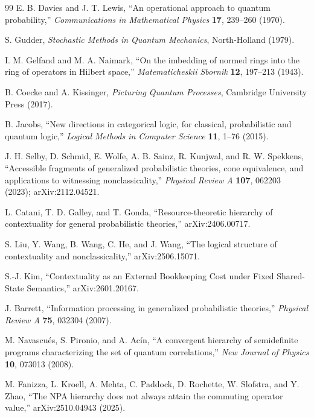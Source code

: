 \documentclass[11pt]{article}
\begin{document}
\begin{thebibliography}{99}
E. B. Davies and J. T. Lewis, ``An operational approach to quantum probability,'' \emph{Communications in Mathematical Physics} \textbf{17}, 239--260 (1970).

S. Gudder, \emph{Stochastic Methods in Quantum Mechanics}, North-Holland (1979).


I. M. Gelfand and M. A. Naimark, ``On the imbedding of normed rings into the ring of operators in Hilbert space,'' \emph{Matematicheskii Sbornik} \textbf{12}, 197--213 (1943).

B. Coecke and A. Kissinger, \emph{Picturing Quantum Processes}, Cambridge University Press (2017).

B. Jacobs, ``New directions in categorical logic, for classical, probabilistic and quantum logic,'' \emph{Logical Methods in Computer Science} \textbf{11}, 1--76 (2015).

J. H. Selby, D. Schmid, E. Wolfe, A. B. Sainz, R. Kunjwal, and R. W. Spekkens, ``Accessible fragments of generalized probabilistic theories, cone equivalence, and applications to witnessing nonclassicality,'' \emph{Physical Review A} \textbf{107}, 062203 (2023); arXiv:2112.04521.

L. Catani, T. D. Galley, and T. Gonda, ``Resource-theoretic hierarchy of contextuality for general probabilistic theories,'' arXiv:2406.00717.

S. Liu, Y. Wang, B. Wang, C. He, and J. Wang, ``The logical structure of contextuality and nonclassicality,'' arXiv:2506.15071.

S.-J. Kim, ``Contextuality as an External Bookkeeping Cost under Fixed Shared-State Semantics,'' arXiv:2601.20167.

J. Barrett, ``Information processing in generalized probabilistic theories,'' \emph{Physical Review A} \textbf{75}, 032304 (2007).

M. Navascu\'es, S. Pironio, and A. Ac\'in, ``A convergent hierarchy of semidefinite programs characterizing the set of quantum correlations,'' \emph{New Journal of Physics} \textbf{10}, 073013 (2008).

M. Fanizza, L. Kroell, A. Mehta, C. Paddock, D. Rochette, W. Slofstra, and Y. Zhao, ``The NPA hierarchy does not always attain the commuting operator value,'' arXiv:2510.04943 (2025).


\end{thebibliography}
\end{document}
